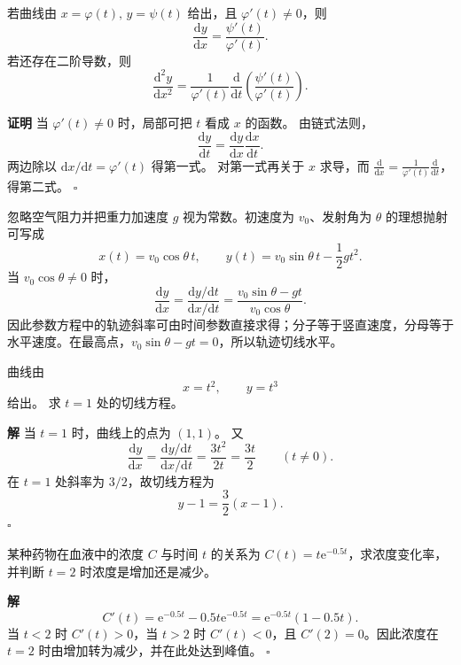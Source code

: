 \documentclass[fontset=fandol]{ctexart}
\newenvironment{proofdetail}{\par\noindent\textbf{证明}\quad}{\hfill$\square$\par\vspace{0.8em}}
\newenvironment{solution}{\par\noindent\textbf{解}\quad}{\hfill$\square$\par\vspace{0.8em}}
\newcommand{\dd}{\mathrm{d}}
\newcommand{\ee}{\mathrm{e}}
\begin{document}
\fi


\begin{proposition}[参数方程求导]
若曲线由 $x=\varphi(t),\,y=\psi(t)$ 给出，且 $\varphi'(t)\neq0$，则
\[
\frac{\dd y}{\dd x}=\frac{\psi'(t)}{\varphi'(t)}.
\]
若还存在二阶导数，则
\[
\frac{\dd^2y}{\dd x^2}
=\frac{1}{\varphi'(t)}\frac{\dd}{\dd t}\left(\frac{\psi'(t)}{\varphi'(t)}\right).
\]
\end{proposition}
\begin{proofdetail}
当 $\varphi'(t)\neq0$ 时，局部可把 $t$ 看成 $x$ 的函数。 由链式法则，
\[
\frac{\dd y}{\dd t}=\frac{\dd y}{\dd x}\frac{\dd x}{\dd t}.
\]
两边除以 $\dd x/\dd t=\varphi'(t)$ 得第一式。 对第一式再关于 $x$ 求导，而 $\frac{\dd}{\dd x}=\frac1{\varphi'(t)}\frac{\dd}{\dd t}$，得第二式。
\end{proofdetail}

\begin{application}
忽略空气阻力并把重力加速度 $g$ 视为常数。初速度为 $v_0$、发射角为 $\theta$ 的理想抛射可写成
\[
x(t)=v_0\cos\theta\,t,\qquad
y(t)=v_0\sin\theta\,t-\frac12gt^2.
\]
当 $v_0\cos\theta\neq0$ 时，
\[
\frac{\dd y}{\dd x}
=\frac{\dd y/\dd t}{\dd x/\dd t}
=\frac{v_0\sin\theta-gt}{v_0\cos\theta}.
\]
因此参数方程中的轨迹斜率可由时间参数直接求得；分子等于竖直速度，分母等于水平速度。在最高点，$v_0\sin\theta-gt=0$，所以轨迹切线水平。
\end{application}

\begin{example}[参数方程求切线]
曲线由
\[
x=t^2,\qquad y=t^3
\]
给出。 求 $t=1$ 处的切线方程。
\end{example}
\begin{solution}
当 $t=1$ 时，曲线上的点为 $(1,1)$。 又
\[
\frac{\dd y}{\dd x}
=\frac{\dd y/\dd t}{\dd x/\dd t}
=\frac{3t^2}{2t}
=\frac{3t}{2}\qquad(t\neq0).
\]
在 $t=1$ 处斜率为 $3/2$，故切线方程为
\[
y-1=\frac32(x-1).
\]
\end{solution}

\begin{example}[增长率]
某种药物在血液中的浓度 $C$ 与时间 $t$ 的关系为 $C(t)=t\ee^{-0.5t}$，求浓度变化率，并判断 $t=2$ 时浓度是增加还是减少。
\end{example}
\begin{solution}
\[
C'(t)=\ee^{-0.5t}-0.5t\ee^{-0.5t}=\ee^{-0.5t}(1-0.5t).
\]
当 \(t<2\) 时 \(C'(t)>0\)，当 \(t>2\) 时 \(C'(t)<0\)，且 \(C'(2)=0\)。因此浓度在 \(t=2\) 时由增加转为减少，并在此处达到峰值。
\end{solution}
\end{document}
